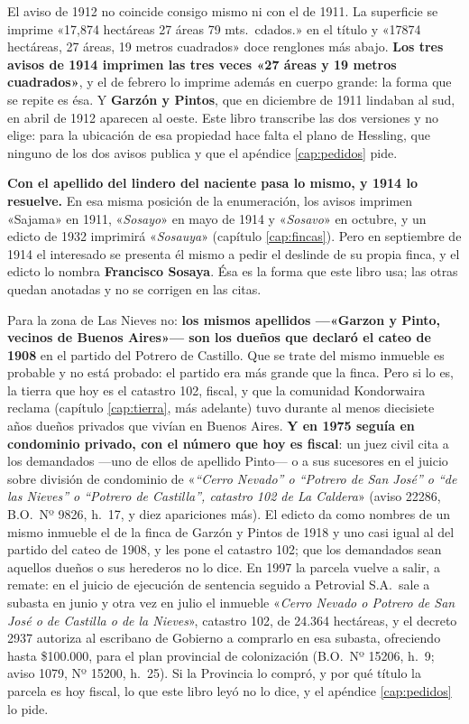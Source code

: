 \begin{cautela}
El aviso de 1912 no coincide consigo mismo ni con el de 1911. La superficie se imprime
«17,874 hectáreas 27 áreas 79 mts.\ cdados.» en el título y «17874 hectáreas, 27 áreas, 19 metros
cuadrados» doce renglones más abajo. \textbf{Los tres avisos de 1914 imprimen las tres veces «27 áreas y 19 metros cuadrados»}, y el de febrero lo imprime además en cuerpo grande: la forma que se repite es ésa. Y \textbf{Garzón y Pintos}, que en diciembre de 1911
lindaban al sud, en abril de 1912 aparecen al oeste. Este libro transcribe las dos versiones y no
elige: para la ubicación de esa propiedad hace falta el plano de Hessling, que ninguno de los dos
avisos publica y que el apéndice \ref{cap:pedidos} pide.

\textbf{Con el apellido del lindero del naciente pasa lo mismo, y 1914 lo resuelve.} En esa
misma posición de la enumeración, los avisos imprimen «Sajama» en 1911, «\textit{Sosayo}» en
mayo de 1914 y «\textit{Sosavo}» en octubre, y un edicto de 1932 imprimirá «\textit{Sosauya}»
(capítulo \ref{cap:fincas}). Pero en septiembre de 1914 el interesado se presenta él mismo a
pedir el deslinde de su propia finca, y el edicto lo nombra \textbf{Francisco Sosaya}. Ésa es
la forma que este libro usa; las otras quedan anotadas y no se corrigen en las citas.
\end{cautela} Para la zona de Las Nieves no: \textbf{los mismos apellidos ---«Garzon y
Pinto, vecinos de Buenos Aires»--- son los dueños que declaró el cateo de 1908} en el partido del
Potrero de Castillo. Que se trate del mismo inmueble es probable y no está probado: el partido era
más grande que la finca. Pero si lo es, la tierra que hoy es el catastro 102, fiscal, y que la
comunidad Kondorwaira reclama (capítulo \ref{cap:tierra}, más adelante) tuvo durante al menos diecisiete años
dueños privados que vivían en Buenos Aires. \textbf{Y en 1975 seguía en condominio privado, con el número que hoy es fiscal}: un juez civil cita a los demandados ---uno de ellos de apellido Pinto--- o a sus sucesores en el juicio sobre división de condominio de «\textit{``Cerro Nevado'' o ``Potrero de San José'' o ``de las Nieves'' o ``Potrero de Castilla'', catastro 102 de La Caldera}» (aviso 22286, B.O.\ Nº 9826, h.\ 17, y diez apariciones más). El edicto da como nombres de un mismo inmueble el de la finca de Garzón y Pintos de 1918 y uno casi igual al del partido del cateo de 1908, y les pone el catastro 102; que los demandados sean aquellos dueños o sus herederos no lo dice. En 1997 la parcela vuelve a salir, a remate: en el juicio de ejecución de sentencia seguido a Petrovial S.A.\ sale a subasta en junio y otra vez en julio el inmueble «\textit{Cerro Nevado o Potrero de San José o de Castilla o de la Nieves}», catastro 102, de 24.364 hectáreas, y el decreto 2937 autoriza al escribano de Gobierno a comprarlo en esa subasta, ofreciendo hasta \$100.000, para el plan provincial de colonización (B.O.\ Nº 15206, h.\ 9; aviso 1079, Nº 15200, h.\ 25). Si la Provincia lo compró, y por qué título la parcela es hoy fiscal, lo que este libro leyó no lo dice, y el apéndice \ref{cap:pedidos} lo pide.

